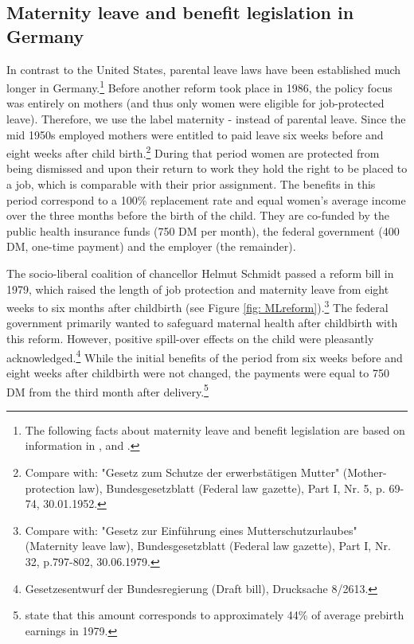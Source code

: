 \documentclass[a4paper ]{article}
\begin{document}
\bigskip
\subsection{Maternity leave and benefit legislation in Germany}\label{sec:reform}

In contrast to the United States, parental leave laws have been established much longer in Germany.\footnote{The following facts about maternity leave and benefit legislation are based on information in \cite{DIW2002}, \cite{schonberg2014expansions} and  \cite{zmarzlik1999mutterschutzgesetz}.} Before another reform took place in 1986, the policy focus was entirely on mothers (and thus only women were eligible for job-protected leave). Therefore, we use the label maternity - instead of parental leave. Since the mid 1950s employed mothers were entitled to paid leave six weeks before and eight weeks after child birth.\footnote{Compare with: "Gesetz zum Schutze der erwerbstätigen Mutter" (Mother-protection law), Bundesgesetzblatt (Federal law gazette), Part I, Nr. 5, p. 69-74, 30.01.1952.} \newline During that period women are protected from being dismissed and upon their return to work they hold the right to be placed to a job, which is comparable with their prior assignment. The benefits in this period correspond to a 100\% replacement rate and equal women's average income over the three months before the birth of the child. They are co-funded by the public health insurance funds (750 DM per month), the federal government (400 DM, one-time payment) and the employer (the remainder).\newline

The socio-liberal coalition of chancellor Helmut Schmidt passed a reform bill in 1979, which raised the length of job protection and maternity leave from eight weeks to six months after childbirth (see Figure \ref{fig: MLreform}).\footnote{Compare with: "Gesetz zur Einführung eines Mutterschutzurlaubes" (Maternity leave law), Bundesgesetzblatt (Federal law gazette), Part I, Nr. 32, p.797-802, 30.06.1979.} The federal government primarily wanted to safeguard maternal health after childbirth with this reform. However, positive spill-over effects on the child were pleasantly acknowledged.\footnote{Gesetzesentwurf der Bundesregierung (Draft bill), Drucksache 8/2613.} While the initial benefits of the period from six weeks before and eight weeks after childbirth were not changed, the payments were equal to 750 DM from the third month after delivery.\footnote{\cite{schonberg2014expansions} state that this amount corresponds to approximately 44\% of average prebirth earnings in 1979.} %
\newline
\end{document}
